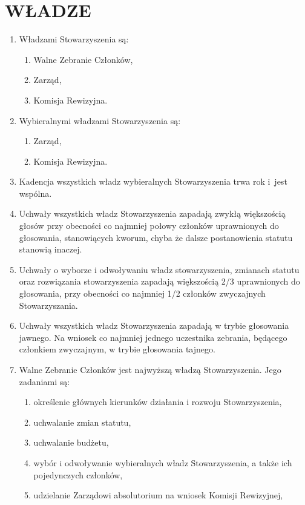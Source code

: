 \documentclass{article}
\begin{document}
\section{WŁADZE}
  \begin{enumerate}
    \item Władzami Stowarzyszenia są:
      \begin{enumerate}
        \item Walne Zebranie Członków,
        \item Zarząd,
        \item Komisja Rewizyjna.
      \end{enumerate}
    \item Wybieralnymi władzami Stowarzyszenia są:
      \begin{enumerate}
        \item Zarząd,
        \item Komisja Rewizyjna.
      \end{enumerate}
    \item Kadencja wszystkich władz wybieralnych Stowarzyszenia trwa rok i~jest wspólna.
    \item Uchwały wszystkich władz Stowarzyszenia zapadają zwykłą większością głosów przy obecności co najmniej połowy członków uprawnionych do głosowania, stanowiących kworum, chyba że dalsze postanowienia statutu stanowią inaczej.
    \item Uchwały o wyborze i odwoływaniu władz stowarzyszenia, zmianach statutu oraz rozwiązania stowarzyszenia zapadają większością 2/3 uprawnionych do głosowania, przy obecności co najmniej 1/2 członków zwyczajnych Stowarzyszania.
    \item Uchwały wszystkich władz Stowarzyszenia zapadają w trybie głosowania jawnego. Na wniosek co najmniej jednego uczestnika zebrania, będącego członkiem zwyczajnym, w trybie głosowania tajnego.
    \item Walne Zebranie Członków jest najwyższą władzą Stowarzyszenia. Jego zadaniami są:
      \begin{enumerate}
        \item określenie głównych kierunków działania i rozwoju Stowarzyszenia,
        \item uchwalanie zmian statutu,
        \item uchwalanie budżetu,
        \item wybór i odwoływanie wybieralnych władz Stowarzyszenia, a także ich pojedynczych członków,
        \item udzielanie Zarządowi absolutorium na wniosek Komisji Rewizyjnej,

\end{enumerate}
\end{enumerate}
\end{document}
